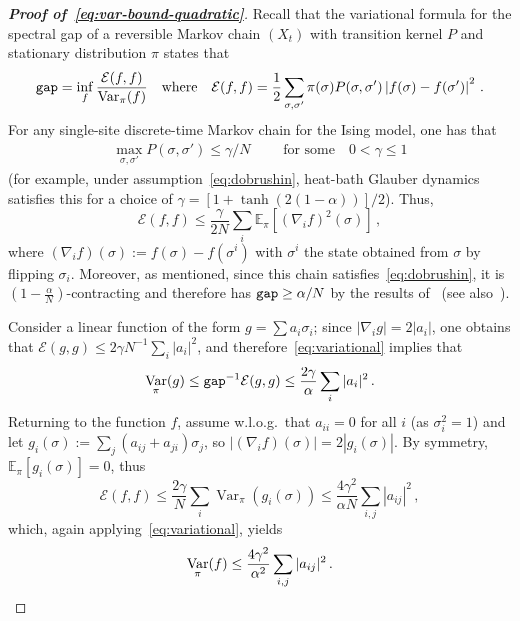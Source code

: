 \documentclass[reqno,11pt]{amsart}
\numberwithin{equation}{section}
\theoremstyle{definition}{
\newtheorem{example}[theorem]{Example}
\newtheorem{definition}[theorem]{Definition}
\newtheorem*{definition*}{Definition}
\newtheorem{problem}[theorem]{Problem}
\newtheorem{question}[theorem]{Question}
\newtheorem{remark}[theorem]{Remark}
}
\newcommand{\E}{\mathbb E}
\newcommand{\cE}{\ensuremath{\mathcal E}}
\DeclareMathOperator{\var}{Var}
\newcommand{\gap}{\text{\tt{gap}}}
\begin{document}
\begin{proof}[\textbf{\emph{Proof of~\eqref{eq:var-bound-quadratic}}}]
Recall that the variational formula for the spectral gap of a reversible Markov chain $(X_t)$ with transition kernel $P$ and stationary distribution $\pi$ states that
\begin{equation}\label{eq:variational} \gap = \inf_{f} \frac{\cE(f,f)}{\var_\pi(f)}\quad\mbox{where}\quad\cE(f,f) = \frac12 \sum_{\sigma,\sigma'} \pi(\sigma) P(\sigma,\sigma') \left|f(\sigma)-f(\sigma')\right|^2\,.
\end{equation}
For any single-site discrete-time Markov chain for the Ising model, one has that
\begin{align}\label{eq:gamma}  \max_{\sigma,\sigma'}  P(\sigma,\sigma') \leq \gamma/N\qquad\mbox{ for some} \quad 0<\gamma\leq1
\end{align}
(for example, under assumption~\eqref{eq:dobrushin},  heat-bath Glauber dynamics satisfies
this  for a choice of $ \gamma = \left[1+\tanh(2(1-\alpha))\right]/2$).
 Thus,
\begin{equation}\label{eq:Dirichlet-bound} \cE(f,f) \leq \frac{\gamma}{2N}  \sum_i \E_\pi \left[ (\nabla_i f)^2(\sigma)\right]\,, 	
\end{equation}
where $(\nabla_i f)(\sigma) := f(\sigma)-f(\sigma^i)$ with $\sigma^i$  the state obtained from $\sigma$ by flipping $\sigma_i$.
Moreover, as mentioned, since this chain satisfies~\eqref{eq:dobrushin}, it is $(1-\frac{\alpha}N)$-contracting and therefore has $\gap \geq \alpha/N$ by the results of~\cite{Chen00} (see also~\cite[Theorem~13.1]{LPW09}).

Consider a linear function of the form $g = \sum a_i \sigma_i$; since $|\nabla_i g| = 2|a_i|$, one obtains that
$ \cE(g,g) \leq 2\gamma N^{-1} \sum_i |a_i|^2$,
and therefore~\eqref{eq:variational} implies that
\begin{align}\label{eq:square-of-lipschitz}
 \var_\pi(g) \leq \gap^{-1} \cE(g,g) \leq  \frac{2\gamma}{\alpha} \sum_i |a_i|^2\,.
\end{align}
Returning to the function $f$,  assume w.l.o.g.\ that $a_{ii}=0$ for all $i$ (as $\sigma_i^2=1$) and let $g_i(\sigma) := \sum_j (a_{ij} + a_{ji}) \sigma_j$, so $|(\nabla_i f)(\sigma)|=2|g_i(\sigma)|$.  By  symmetry, $\E_\pi[g_i(\sigma)] = 0$, thus
\[ \cE(f,f) \leq \frac{2\gamma}{N} \sum_i \var_\pi \left(g_i(\sigma)\right)  \leq  \frac{4\gamma^2}{\alpha N} \sum_{i,j}|a_{ij}|^2\,, \]
which, again applying~\eqref{eq:variational}, yields
\[ \var_\pi(f) \leq \frac{4\gamma^2}{\alpha^2}\sum_{i,j}|a_{ij}|^2\,.\qedhere \] 
\end{proof}
\end{document}
